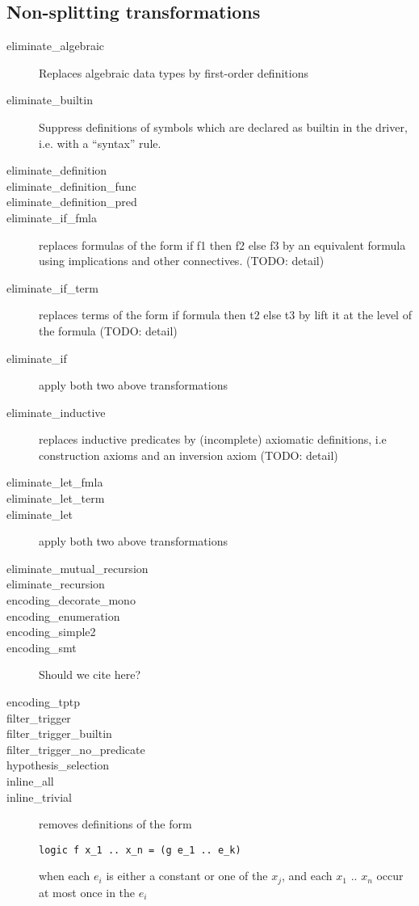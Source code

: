 \subsection{Non-splitting transformations}

\begin{description}
\item[eliminate\_algebraic] Replaces algebraic data types by first-order
definitions~\cite{paskevich09rr}
\item[eliminate\_builtin] Suppress definitions of symbols which are
  declared as builtin in the driver, i.e. with a ``syntax'' rule.
  
\item[eliminate\_definition]
\item[eliminate\_definition\_func]
\item[eliminate\_definition\_pred]
\item[eliminate\_if\_fmla] replaces formulas of the form if f1 then f2
  else f3 by an equivalent formula using implications and other
  connectives. (TODO: detail)
\item[eliminate\_if\_term] replaces terms of the form if formula then
  t2 else t3 by lift it at the level of the formula (TODO: detail)
\item[eliminate\_if]
  apply both two above transformations
\item[eliminate\_inductive] replaces inductive predicates by
  (incomplete) axiomatic definitions, i.e construction axioms and an
  inversion axiom (TODO: detail)
\item[eliminate\_let\_fmla]
\item[eliminate\_let\_term]
\item[eliminate\_let]
  apply both two above transformations
\item[eliminate\_mutual\_recursion]
\item[eliminate\_recursion]
\item[encoding\_decorate\_mono]
\item[encoding\_enumeration]
\item[encoding\_simple2]
\item[encoding\_smt]
Should we cite \cite{conchon08smt} here?
\item[encoding\_tptp]
\item[filter\_trigger]
\item[filter\_trigger\_builtin]
\item[filter\_trigger\_no\_predicate]
\item[hypothesis\_selection]
\item[inline\_all]
\item[inline\_trivial]
  removes definitions of the form
\begin{verbatim}
logic f x_1 .. x_n = (g e_1 .. e_k)
\end{verbatim}
when each $e_i$ is either a constant or one of the $x_j$, and
each $x_1$ .. $x_n$ occur at most once in the $e_i$ 


\end{description}
